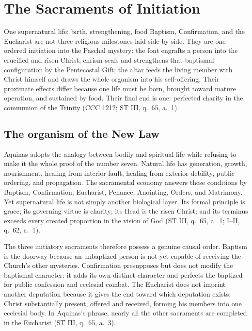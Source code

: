 \section{The Sacraments of Initiation}

\begin{massbox}{One supernatural life: birth, strengthening, food}
Baptism, Confirmation, and the Eucharist are not three religious milestones laid side by side. They are one ordered initiation into the Paschal mystery: the font engrafts a person into the crucified and risen Christ; chrism seals and strengthens that baptismal configuration by the Pentecostal Gift; the altar feeds the living member with Christ himself and draws the whole organism into his self-offering. Their proximate effects differ because one life must be born, brought toward mature operation, and sustained by food. Their final end is one: perfected charity in the communion of the Trinity (CCC 1212; ST III, q.~65, a.~1).
\end{massbox}

\subsection{The organism of the New Law}

Aquinas adopts the analogy between bodily and spiritual life while refusing to make it the whole proof of the number seven. Natural life has generation, growth, nourishment, healing from interior fault, healing from exterior debility, public ordering, and propagation. The sacramental economy answers these conditions by Baptism, Confirmation, Eucharist, Penance, Anointing, Orders, and Matrimony. Yet supernatural life is not simply another biological layer. Its formal principle is grace; its governing virtue is charity; its Head is the risen Christ; and its terminus exceeds every created proportion in the vision of God (ST III, q.~65, a.~1; I--II, q.~62, a.~1).

The three initiatory sacraments therefore possess a genuine causal order. Baptism is the doorway because an unbaptized person is not yet capable of receiving the Church's other mysteries. Confirmation presupposes but does not modify the baptismal character: it adds its own distinct character and perfects the baptized for public confession and ecclesial combat. The Eucharist does not imprint another deputation because it gives the end toward which deputation exists: Christ substantially present, offered and received, forming his members into one ecclesial body. In Aquinas's phrase, nearly all the other sacraments are completed in the Eucharist (ST III, q.~65, a.~3).

